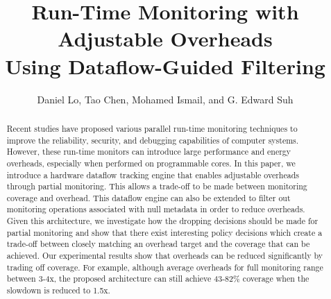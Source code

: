 \title{
Run-Time Monitoring with Adjustable Overheads \\Using Dataflow-Guided Filtering
}

{\author{Daniel Lo, Tao Chen, Mohamed Ismail, and G. Edward Suh}}

\date{}
\maketitle

\thispagestyle{empty}

\begin{abstract}

Recent studies have proposed various parallel run-time monitoring techniques to
improve the reliability, security, and debugging capabilities of computer
systems. However, these run-time monitors can introduce large performance and energy
overheads, especially when performed on programmable cores.
In this paper, we introduce a hardware dataflow tracking engine that enables
adjustable overheads through partial monitoring. This allows a trade-off to be
made between monitoring coverage and overhead. This dataflow engine
can also be extended to filter out monitoring operations associated with null
metadata in order to reduce overheads.
Given this architecture, we investigate how the dropping decisions should be
made for partial monitoring and show that there exist interesting policy
decisions which create a trade-off between closely
matching an overhead target and the coverage that can be achieved.
Our experimental results show that overheads can be reduced significantly 
by trading off coverage. For example, although average overheads for full
monitoring range between 3-4x, the proposed architecture can still
achieve 43-82\% coverage when the slowdown is reduced to 1.5x.

\end{abstract}
